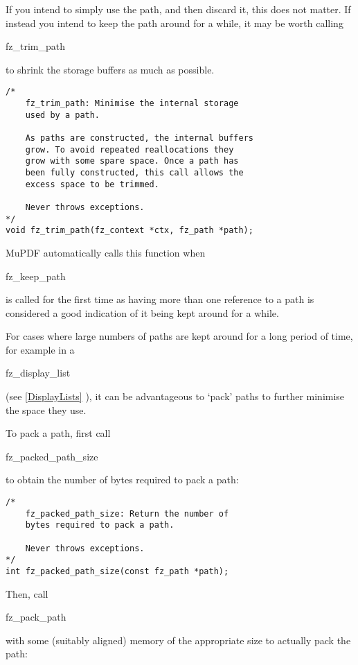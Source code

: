 \documentclass[oneside]{book}
\newcommand{\rjwref}[1] {\autoref{#1} \nameref{#1}}
\begin{document}
If you intend to simply use the path, and then discard it, this does not matter. If instead you intend to keep the path around for a while, it may be worth calling \begin{tt}fz\_trim\_path\end{tt} to shrink the storage buffers as much as possible.

\begin{lstlisting}
/*
	fz_trim_path: Minimise the internal storage
	used by a path.

	As paths are constructed, the internal buffers
	grow. To avoid repeated reallocations they
	grow with some spare space. Once a path has
	been fully constructed, this call allows the
	excess space to be trimmed.

	Never throws exceptions.
*/
void fz_trim_path(fz_context *ctx, fz_path *path);
\end{lstlisting}

MuPDF automatically calls this function when \begin{tt}fz\_keep\_path\end{tt} is called for the first time as having more than one reference to a path is considered a good indication of it being kept around for a while.

For cases where large numbers of paths are kept around for a long period of time, for example in a \begin{tt}fz\_display\_list\end{tt} (see \rjwref{DisplayLists}), it can be advantageous to `pack' paths to further minimise the space they use.

To pack a path, first call \begin{tt}fz\_packed\_path\_size\end{tt} to obtain the number of bytes required to pack a path:

\begin{lstlisting}
/*
	fz_packed_path_size: Return the number of
	bytes required to pack a path.

	Never throws exceptions.
*/
int fz_packed_path_size(const fz_path *path);
\end{lstlisting}

Then, call \begin{tt}fz\_pack\_path\end{tt} with some (suitably aligned) memory of the appropriate size to actually pack the path:
\end{document}
